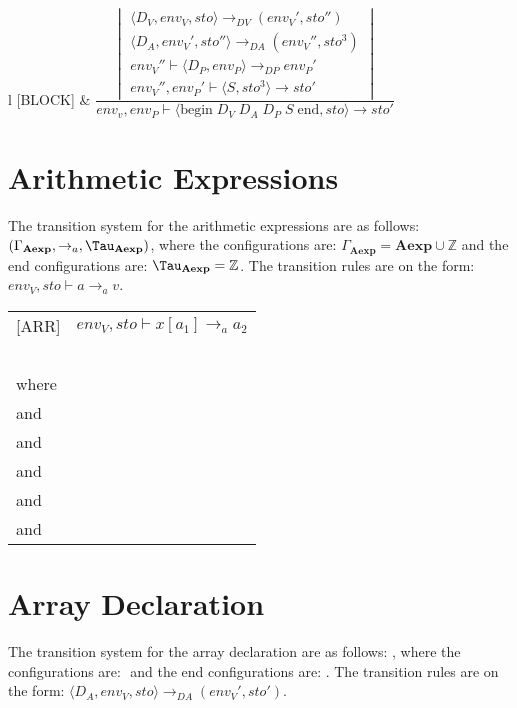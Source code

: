 \begin{table}[H]
\begin{tabular}{l}
[BLOCK] & $\dfrac{\begin{vmatrix} \langle D_V, env_V, sto \rangle \rightarrow_{DV} (env_V', sto'') \\ \langle D_A, env_V', sto'' \rangle \rightarrow_{DA} (env_V'', sto^{3}) \\ env_V'' \vdash \langle D_P, env_P \rangle \rightarrow_{DP} env_P' \\ env_V'', env_P' \vdash \langle S, sto^{3} \rangle \rightarrow sto' \end{vmatrix}}{env_v, env_P \vdash \langle \text{begin} \; D_V \; D_A \; D_P \; S \; \text{end}, sto \rangle \rightarrow sto'}$
\end{tabular}
\end{table}

\section{Arithmetic Expressions}
The transition system for the arithmetic expressions are as follows: $(\Gamma_{\mathbf{Aexp}}, \rightarrow_a, \Tau_{\mathbf{Aexp}})$, where the configurations are: $\Gamma_{\mathbf{Aexp}} = \textbf{Aexp} \cup \mathbb{Z}$ and the end configurations are: $\Tau_{\mathbf{Aexp}} = \mathbb{Z}$. 
The transition rules are on the form: $env_V, sto \vdash a \rightarrow_a v$.

\begin{table}[H]
\begin{tabular}{l l}
[ARR] & $env_V, sto \vdash x[a_1] \rightarrow_a a_2$ \\
~ & ~ \\
where} \; $env_V, sto \vdash a_1 \rightarrow_a v_1$ \\
and} \; $env_V, sto \vdash a_2 \rightarrow_a v_2$ \\
and} $env_V \; x = l$ \\
and} $sto \; l = v_3$ \\
and} $0 < v_1 \leq v_3$ \\
and} $sto(l + v_1) = v_2$ \\
\end{tabular}
\end{table}

\section{Array Declaration}
The transition system for the array declaration are as follows: $ $, where the configurations are: $ $ and the end configurations are: $ $. 
The transition rules are on the form: $\langle D_A, env_V, sto \rangle \rightarrow_{DA} (env_V', sto')$.

